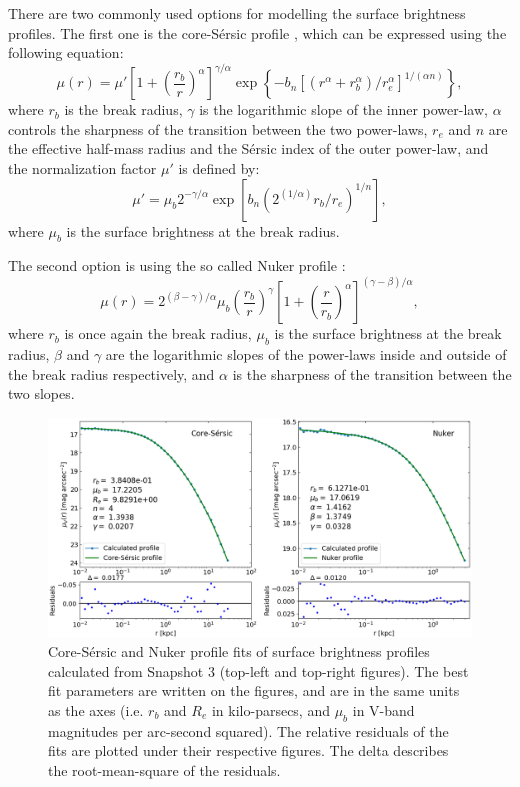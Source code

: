 \documentclass[english, oneside]{HYgradu}
\begin{document}
There are two commonly used options for modelling the surface brightness profiles. The first one is the core-Sérsic profile \citep{Graham2003}, which can be expressed using the following equation:
\begin{equation}
\mu(r) = \mu' \left[ 1 + \left( \frac{r_b}{r} \right)^\alpha \right]^{\gamma / \alpha} \exp \left\lbrace -b_n \left[ \left( r^\alpha + r_b^\alpha \right) / r_e^\alpha \right]^{1/(\alpha n)} \right\rbrace, \label{eq:core-sersic}
\end{equation}
where $r_b$ is the break radius, $\gamma$ is the logarithmic slope of the inner power-law, $\alpha$ controls the sharpness of the transition between the two power-laws, $r_e$ and $n$ are the effective half-mass radius and the Sérsic index of the outer power-law, and the normalization factor $\mu'$ is defined by:
\begin{equation}
\mu' = \mu_b 2^{-\gamma/\alpha} \exp \left[ b_n \left( 2^(1/\alpha) r_b/r_e \right)^{1/n} \right], 
\label{eq:mu_dot}
\end{equation}
where $\mu_b$ is the surface brightness at the break radius. 

The second option is using the so called Nuker profile \citep{Lauer1995}:
\begin{equation}
\mu(r) = 2^{(\beta - \gamma) / \alpha} \mu_b \left( \frac{r_b}{r} \right)^\gamma \left[ 1 + \left( \frac{r}{r_b} \right)^\alpha \right]^{(\gamma - \beta)/\alpha},
\label{eq:nuker}
\end{equation}
where $r_b$ is once again the break radius, $\mu_b$ is the surface brightness at the break radius, $\beta$ and $\gamma$ are the logarithmic slopes of the power-laws inside and outside of the break radius respectively, and $\alpha$ is the sharpness of the transition between the two slopes.

\begin{figure}[h]
	\centering
	\includegraphics[width=\textwidth]{core_nuker_fits.png}
	\caption{Core-Sérsic and Nuker profile fits of surface brightness profiles calculated from Snapshot 3 (top-left and top-right figures). The best fit parameters are written on the figures, and are in the same units as the axes (i.e. $r_b$ and $R_e$ in kilo-parsecs, and $\mu_b$ in V-band magnitudes per arc-second squared). The relative residuals of the fits are plotted under their respective figures. The delta describes the root-mean-square of the residuals.}
	\label{figure:core_nuker}
\end{figure}
\end{document}
